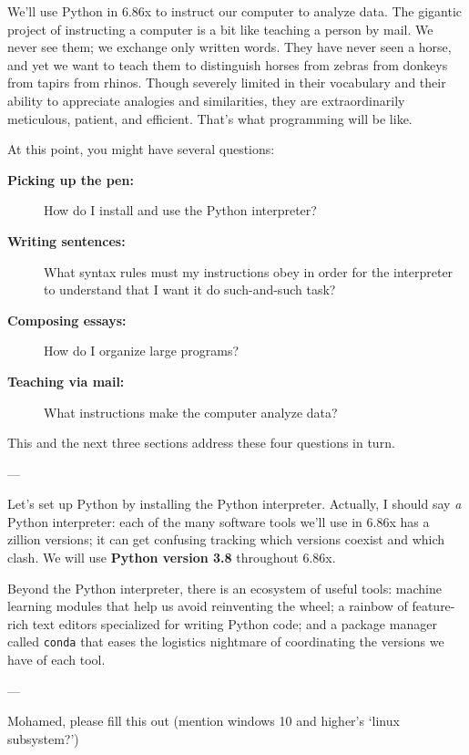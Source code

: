 \documentclass[11pt, justified]{tufte-book}
\newcommand{\attnsam}[1]{{\red \textsf{#1}}}
\newcommand{\sampassage}[1]{
   \vspace{0.1cm}
   \par\noindent{\hspace{-2cm}\normalsize \sc \gre #1} ---
}
\theoremstyle{definition}
\begin{document}
        We'll use Python in 6.86x to instruct our computer to analyze data.
        The gigantic project of instructing a computer is a bit like teaching a
        person by mail.  We never see them; we exchange only written words.
        They have never seen a horse, and yet we want to teach them to
        distinguish horses from zebras from donkeys from tapirs from rhinos.
        Though severely limited in their vocabulary and their ability to
        appreciate analogies and similarities, they are extraordinarily
        meticulous, patient, and efficient. 
        That's what programming will be like.

        At this point, you might have several questions:
        \begin{description}
          \item[\textbf{Picking up the pen:}] How do I install and use the Python
               interpreter? 
          \item[\textbf{Writing sentences:}] What syntax rules must my
               instructions obey in order for the interpreter to understand
                that I want it do such-and-such task? 
          \item[\textbf{Composing essays:}] How do I organize large programs?
          \item[\textbf{Teaching via mail:}] What instructions
               make the computer analyze data?
        \end{description}
        This and the next three sections address these four
        questions in turn.

      \sampassage{which things we'll set up}
        Let's set up Python by installing the Python interpreter.
        Actually, I should say \emph{a} Python interpreter: each of the many
        software tools we'll use in 6.86x has a zillion versions; it can get
        confusing tracking which versions coexist and which clash.  We will use
        \textbf{Python version 3.8} throughout 6.86x.

        Beyond the Python interpreter, there is an ecosystem of useful tools:
        machine learning modules that help us avoid reinventing the wheel; a
        rainbow of feature-rich text editors specialized for writing Python code;
        and a package manager called \texttt{conda} that eases the logistics
        nightmare of coordinating the versions we have of each tool.

      \sampassage{setup on windows}
        \attnsam{Mohamed, please fill this out}
        \attnsam{(mention windows 10 and higher's `linux subsystem?')}
\end{document}
